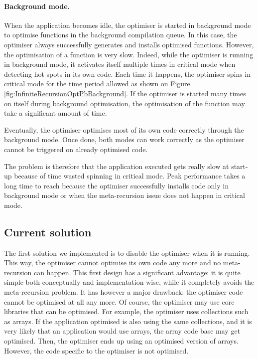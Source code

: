 \documentclass[a4paper,12pt,twoside]{../includes/ThesisStyle}
\begin{document}

\paragraph{Background mode.} When the application becomes idle, the optimiser is started in background mode to optimise functions in the background compilation queue. In this case, the optimiser always successfully generates and installs optimised functions. However, the optimisation of a function is very slow. Indeed, while the optimiser is running in background mode, it activates itself multiple times in critical mode when detecting hot spots in its own code. Each time it happens, the optimiser spins in critical mode for the time period allowed as shown on Figure \ref{fig:InfiniteRecursionOptPbBackground}. If the optimiser is started many times on itself during background optimisation, the optimisation of the function may take a significant amount of time. 

Eventually, the optimiser optimises most of its own code correctly through the background mode. Once done, both modes can work correctly as the optimiser cannot be triggered on already optimised code.

The problem is therefore that the application executed gets really slow at start-up because of time wasted spinning in critical mode. Peak performance takes a long time to reach because the optimiser successfully installs code only in background mode or when the meta-recursion issue does not happen in critical mode. 

\subsection{Current solution}

The first solution we implemented is to disable the optimiser when it is running. This way, the optimiser cannot optimise its own code any more and no meta-recursion can happen. This first design has a significant advantage: it is quite simple both conceptually and implementation-wise, while it completely avoids the meta-recursion problem. It has however a major drawback: the optimiser code cannot be optimised at all any more. Of course, the optimiser may use core libraries that can be optimised. For example, the optimiser uses collections such as arrays. If the application optimised is also using the same collections, and it is very likely that an application would use arrays, the array code base may get optimised. Then, the optimiser ends up using an optimised version of arrays. However, the code specific to the optimiser is not optimised.
\end{document}
